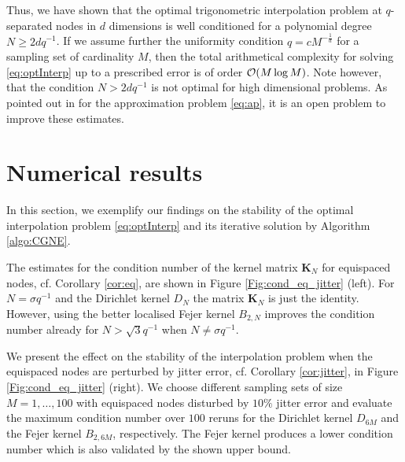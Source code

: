 \documentclass[11pt,a4paper,bibtotoc]{scrartcl}
\newcommand{\zb}[1]{\ensuremath{\boldsymbol{#1}}}
\numberwithin{equation}{section}
\numberwithin{table}{section}
\numberwithin{figure}{section}
\begin{document}
Thus, we have shown that the optimal trigonometric interpolation problem at
$q$-separated nodes in $d$ dimensions is well conditioned for a polynomial
degree $N \ge 2 d q^{-1}$.
If we assume further the uniformity condition $q=c M^{-\frac{1}{d}}$ for a
sampling set of cardinality $M$, then the total arithmetical complexity for
solving \eqref{eq:optInterp} up to a prescribed error is of order ${\cal O}(M
\log M)$.
Note however, that the condition $N> 2 d q^{-1}$ is not optimal for high
dimensional problems.
As pointed out in \cite{BaGr04} for the approximation problem \eqref{eq:ap},
it is an open problem to improve these estimates.

\section{Numerical results}
In this section, we exemplify our findings on the stability of the optimal
interpolation problem \eqref{eq:optInterp} and its iterative solution by
Algorithm \ref{algo:CGNE}.

The estimates for the condition number of the kernel matrix $\zb K_N$ for
equispaced nodes, cf. Corollary \ref{cor:eq}, are shown in Figure
\ref{Fig:cond_eq_jitter} (left).
For $N=\sigma q^{-1}$ and the Dirichlet kernel $D_N$ the matrix $\zb K_N$ is
just the identity.
However, using the better localised Fejer kernel $B_{2,N}$ improves the
condition number already for $N>\sqrt{3}q^{-1}$ when $N\ne\sigma q^{-1}$.

We present the effect on the stability of the interpolation problem when the
equispaced nodes are perturbed by jitter error, cf. Corollary
\ref{cor:jitter}, in Figure \ref{Fig:cond_eq_jitter} (right).
We choose different sampling sets of size $M=1,\hdots,100$ with equispaced
nodes disturbed by $10\%$ jitter error and evaluate the maximum condition
number over $100$ reruns for the Dirichlet kernel $D_{6M}$ and the Fejer
kernel $B_{2,6M}$, respectively.
The Fejer kernel produces a lower condition number which is also validated by
the shown upper bound.
\end{document}
